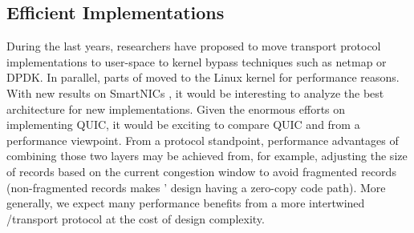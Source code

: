 \subsection{Efficient \tcpls Implementations}

During the last years, researchers have proposed
to move transport protocol implementations to user-space
\cite{jeong2014mtcp,marinos2014network} to
kernel bypass techniques such as netmap \cite{rizzo2012revisiting} or
DPDK. In parallel, parts of \tls moved to the Linux kernel
\cite{borkmanncombining} for performance reasons. 
With new results on SmartNICs \cite{firestone2018azure}, it would be
interesting to analyze the best architecture for new \tcpls implementations.
Given the enormous efforts on implementing QUIC\cite{quicimplem},
it would be exciting
to compare QUIC and \tcpls from a performance viewpoint. From a protocol
standpoint, performance advantages of combining those two layers may be
achieved from, for example, adjusting the size of \tls records based on the
current \tcp congestion
window to avoid fragmented records (non-fragmented records makes \tcpls'
design having a zero-copy code path). More generally, we expect many performance
benefits from a more intertwined \tls/\tcp transport protocol at the
cost of design complexity.












